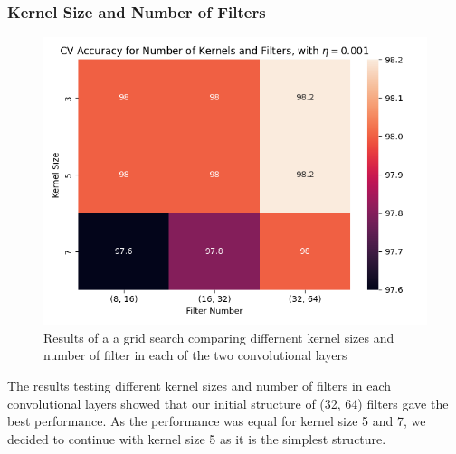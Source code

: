 \subsubsection{Kernel Size and Number of Filters}
\begin{figure}[H]
    \centering
    \includegraphics[width=\textwidth]{results/cnn_grid_search/heatmap_grid_search_kf.png}
    \caption{Results of a a grid search comparing differnent kernel sizes and number of filter in each of the two convolutional layers  }
    \label{fig:cnn_kf}
\end{figure}
The results testing different kernel sizes and number of filters in each convolutional layers showed that our initial structure of (32, 64) filters gave the best performance. As the performance was equal for kernel size 5 and 7, we decided to continue with kernel size 5 as it is the simplest structure.

